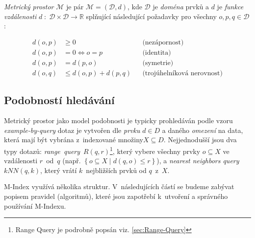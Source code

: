 \emph{Metrický prostor }$\mathcal{M}$ je pár $\mathcal{M}=(\mathcal{D},d)$,
kde $\mathcal{D}$ je \emph{doména} prvků a $d$ je \emph{funkce vzdálenosti}
$d\;:\;\mathcal{D}\times\mathcal{D}\rightarrow\mathbb{R}$ splňující
následující požadavky pro všechny $o,p,q\in\mathcal{D}$:

\begin{align*}
d(o,p) & \geq0 &  & \textrm{(nezápornost)}\\
d(o,p) & =0\Longleftrightarrow o=p &  & \textrm{(identita)}\\
d(o,p) & =d(p,o) &  & \textrm{(symetrie)}\\
d(o,q) & \leq d(o,p)+d(p,q) &  & \textrm{(trojúhelníková nerovnost)}
\end{align*}



\subsection{Podobností hledávání}

Metrický prostor jako model podobnosti je typicky prohledáván podle
vzoru \emph{example-by-query} \textendash{} dotaz je vytvořen dle
\emph{prvku} $d\in D$ a daného \emph{omezení} na data, která mají
být vybrána z~indexované množiny$X\subseteq D$\@. Nejjednodušší
jsou dva typy dotazů: \emph{range~query}~$R(q,r)$\footnote{Range Query je podrobně popsán viz. \vref{sec:Range-Query}
}, který vybere všechny prvky $o\subseteq X$ ve vzdálenosti $r$~od~$q$
(např. $\left\{ o\subseteq X\mid d(q,o)\leq r\right\} $), a \emph{nearest
neighbors query} $kNN(q,k)$, který vrátí $k$~nejbližších prvků
od $q$~z~$X$\@.

M-Index využívá několika struktur\@. V~následujících částí se budeme
zabývat popisem pravidel (algoritmů), které jsou zapotřebí k~utvoření
a správného používání M-Indexu.